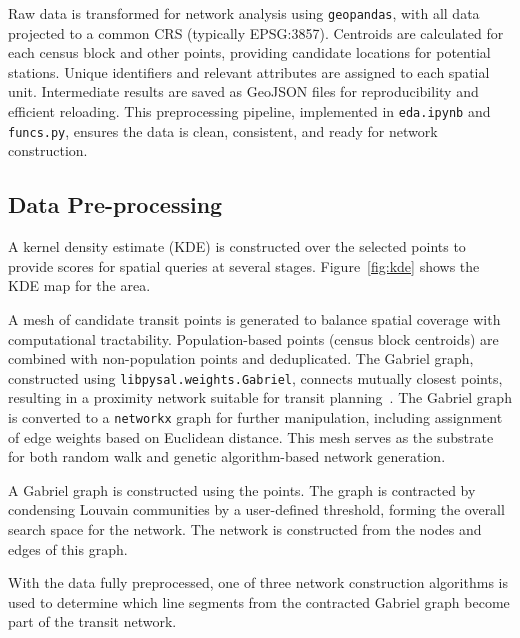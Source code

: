 \documentclass[manuscript]{acmart}
\begin{document}
Raw data is transformed for network analysis using \texttt{geopandas}, with all data projected to a common CRS (typically EPSG:3857). Centroids are calculated for each census block and other points, providing candidate locations for potential stations. Unique identifiers and relevant attributes are assigned to each spatial unit. Intermediate results are saved as GeoJSON files for reproducibility and efficient reloading. This preprocessing pipeline, implemented in \texttt{eda.ipynb} and \texttt{funcs.py}, ensures the data is clean, consistent, and ready for network construction.

\subsection{Data Pre-processing}

A kernel density estimate (KDE) is constructed over the selected points to provide scores for spatial queries at several stages. Figure~\ref{fig:kde} shows the KDE map for the area.

A mesh of candidate transit points is generated to balance spatial coverage with computational tractability. Population-based points (census block centroids) are combined with non-population points and deduplicated. The Gabriel graph, constructed using \texttt{libpysal.weights.Gabriel}, connects mutually closest points, resulting in a proximity network suitable for transit planning~\cite{bib:samet1984quadtrees, bib:libera1986btrees}. The Gabriel graph is converted to a \texttt{networkx} graph for further manipulation, including assignment of edge weights based on Euclidean distance. This mesh serves as the substrate for both random walk and genetic algorithm-based network generation.

A Gabriel graph is constructed using the points. The graph is contracted by condensing Louvain communities by a user-defined threshold, forming the overall search space for the network. The network is constructed from the nodes and edges of this graph.

With the data fully preprocessed, one of three network construction algorithms is used to determine which line segments from the contracted Gabriel graph become part of the transit network.
\end{document}
